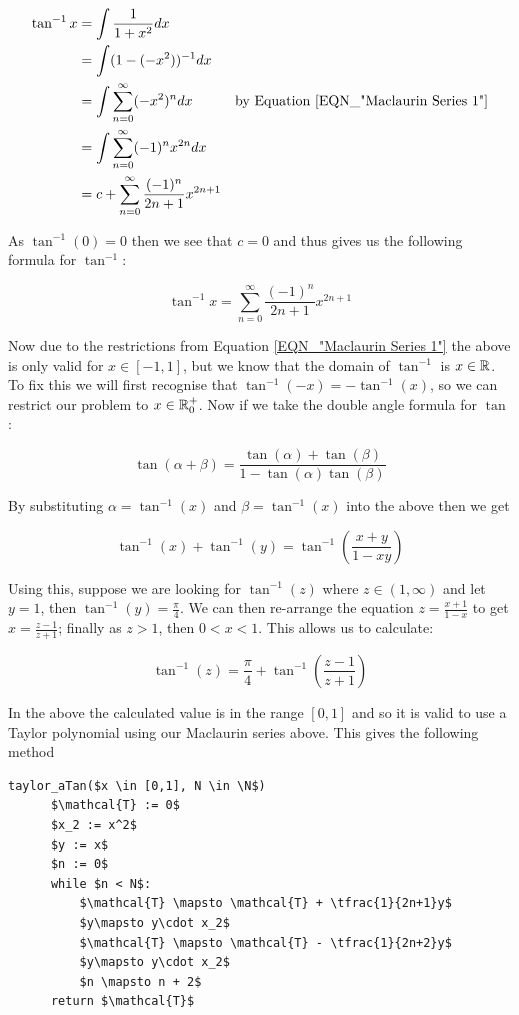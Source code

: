 {\begin{displaymath}
\begin{align*}
	\tan^{-1} x &= \int \frac{1}{1+x^2} dx\\
		&= \int (1 - (-x^2))^{-1} dx\\
		&= \int \sum_{n=0}^\infty (-x^2)^n dx &\textrm{by Equation \ref{EQN_"Maclaurin Series 1"}}\\
		&= \int \sum_{n=0}^\infty (-1)^nx^{2n} dx\\
		&= c + \sum_{n=0}^\infty \frac{(-1)^n}{2n+1}x^{2n+1}
\end{align*}
\end{displaymath}

As \(\tan^{-1} (0) = 0\) then we see that \(c = 0\) and thus gives us the following formula for \(\tan^{-1}\):

\[\tan^{-1} x = \sum_{n=0}^\infty \frac{(-1)^n}{2n+1}x^{2n+1}\]

Now due to the restrictions from Equation \ref{EQN_"Maclaurin Series 1"} the above is only valid for \(x \in [-1, 1]\), but we know that the domain of \(\tan^{-1}\) is \(x \in \mathbb{R}\). To fix this we will first recognise that \(\tan^{-1}(-x) = -\tan^{-1}(x)\), so we can restrict our problem to \(x \in \mathbb{R}^+_0\). Now if we take the double angle formula for \(\tan\):

\[\tan(\alpha + \beta) = \frac{\tan(\alpha) + \tan(\beta)}{1 - \tan(\alpha)\tan(\beta)}\]

By substituting \(\alpha = \tan^{-1}(x)\) and \(\beta = \tan^{-1}(x)\) into the above then we get

\[\tan^{-1}(x) + \tan^{-1}(y) = \tan^{-1}\left(\frac{x + y}{1 - xy}\right)\]

Using this, suppose we are looking for \(\tan^{-1}(z)\) where \(z \in (1, \infty)\) and let \(y = 1\), then \(\tan^{-1}(y) = \frac{\pi}{4}\). We can then re-arrange the equation \(z = \frac{x + 1}{1 - x}\) to get \(x = \frac{z - 1}{z + 1}\); finally as \(z > 1\), then \(0 < x < 1\). This allows us to calculate:

\[\tan^{-1}(z) = \frac{\pi}{4} + \tan^{-1}\left(\frac{z-1}{z+1}\right)\]

In the above the calculated value is in the range \([0, 1]\) and so it is valid to use a Taylor polynomial using our Maclaurin series above. This gives the following method

\begin{lstlisting}[caption={Taylor Method for \(\tan^{-1}\)},label={PCD_"Taylor aTan"}]
  taylor_aTan($x \in [0,1], N \in \N$)
      $\mathcal{T} := 0$
      $x_2 := x^2$
      $y := x$
      $n := 0$
      while $n < N$:
          $\mathcal{T} \mapsto \mathcal{T} + \tfrac{1}{2n+1}y$
          $y\mapsto y\cdot x_2$
          $\mathcal{T} \mapsto \mathcal{T} - \tfrac{1}{2n+2}y$
          $y\mapsto y\cdot x_2$
          $n \mapsto n + 2$
      return $\mathcal{T}$
\end{lstlisting}

}
